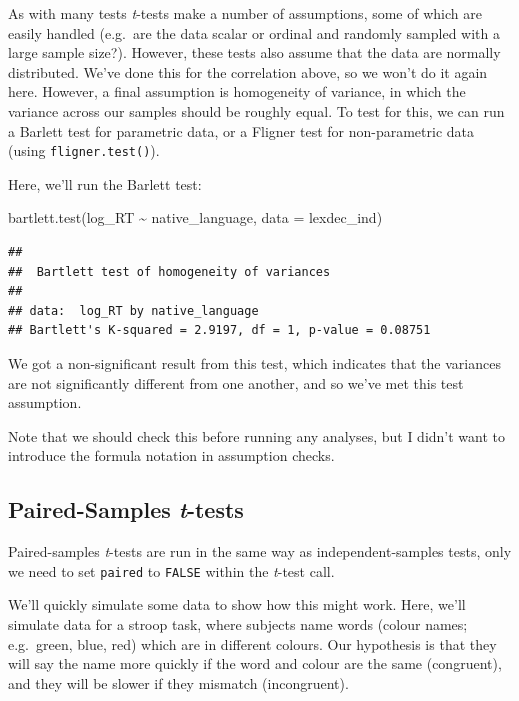 \documentclass[
]{book}
\newenvironment{Shaded}{\begin{snugshade}}{\end{snugshade}}
\newcommand{\AttributeTok}[1]{\textcolor[rgb]{0.77,0.63,0.00}{#1}}
\newcommand{\FunctionTok}[1]{\textcolor[rgb]{0.00,0.00,0.00}{#1}}
\newcommand{\NormalTok}[1]{#1}
\newcommand{\SpecialCharTok}[1]{\textcolor[rgb]{0.00,0.00,0.00}{#1}}
\begin{document}
As with many tests \emph{t}-tests make a number of assumptions, some of which are easily handled (e.g.~are the data scalar or ordinal and randomly sampled with a large sample size?). However, these tests also assume that the data are normally distributed. We've done this for the correlation above, so we won't do it again here. However, a final assumption is homogeneity of variance, in which the variance across our samples should be roughly equal. To test for this, we can run a Barlett test for parametric data, or a Fligner test for non-parametric data (using \texttt{fligner.test()}).

Here, we'll run the Barlett test:

\begin{Shaded}
\begin{Highlighting}[]
\FunctionTok{bartlett.test}\NormalTok{(log\_RT }\SpecialCharTok{\textasciitilde{}}\NormalTok{ native\_language, }\AttributeTok{data =}\NormalTok{ lexdec\_ind)}
\end{Highlighting}
\end{Shaded}

\begin{verbatim}
## 
##  Bartlett test of homogeneity of variances
## 
## data:  log_RT by native_language
## Bartlett's K-squared = 2.9197, df = 1, p-value = 0.08751
\end{verbatim}

We got a non-significant result from this test, which indicates that the variances are not significantly different from one another, and so we've met this test assumption.

Note that we should check this before running any analyses, but I didn't want to introduce the formula notation in assumption checks.

\hypertarget{paired-samples-t-tests}{%
\subsection{\texorpdfstring{Paired-Samples \emph{t}-tests}{Paired-Samples t-tests}}\label{paired-samples-t-tests}}

Paired-samples \emph{t}-tests are run in the same way as independent-samples tests, only we need to set \texttt{paired} to \texttt{FALSE} within the \emph{t}-test call.

We'll quickly simulate some data to show how this might work. Here, we'll simulate data for a stroop task, where subjects name words (colour names; e.g.~green, blue, red) which are in different colours. Our hypothesis is that they will say the name more quickly if the word and colour are the same (congruent), and they will be slower if they mismatch (incongruent).
\end{document}
